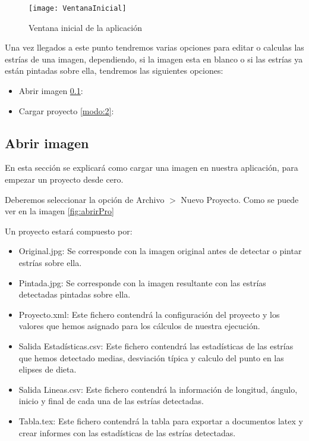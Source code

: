 \begin{figure}[h]
\centering
\texttt{[image: VentanaInicial]}
\caption{Ventana inicial de la aplicación}
\label{fig:E.1}
\end{figure}
Una vez llegados a este punto tendremos varias opciones para editar o calculas las estrías de una imagen, dependiendo, si la imagen esta en blanco o si las estrías ya están pintadas sobre ella, tendremos las siguientes opciones:

\begin{itemize}
	\item Abrir imagen \ref{modo:1}:
	\item Cargar proyecto \ref{modo:2}:
\end{itemize}

\subsection{Abrir imagen}
\label{modo:1}

En esta sección se explicará como cargar una imagen en nuestra aplicación, para empezar un proyecto desde cero.

Deberemos seleccionar la opción de Archivo  $>$ Nuevo Proyecto. Como se puede ver en la imagen \ref{fig:abrirPro}

Un proyecto estará compuesto por:
\begin{itemize}
\item Original.jpg: Se corresponde con la imagen original antes de detectar o pintar estrías sobre ella.
\item Pintada.jpg: Se corresponde con la imagen resultante con las estrías detectadas pintadas sobre ella.
\item Proyecto.xml: Este fichero contendrá la configuración del proyecto y los valores que hemos asignado para los cálculos de nuestra ejecución.
\item Salida Estadísticas.csv: Este fichero contendrá las estadísticas de las estrías que hemos detectado medias, desviación típica y calculo del punto en las elipses de dieta.
\item Salida Lineas.csv: Este fichero contendrá la información de longitud, ángulo, inicio y final de cada una de las estrías detectadas.
\item Tabla.tex: Este fichero contendrá la tabla para exportar a documentos latex y crear informes con las estadísticas de las estrías detectadas.
\end{itemize}

